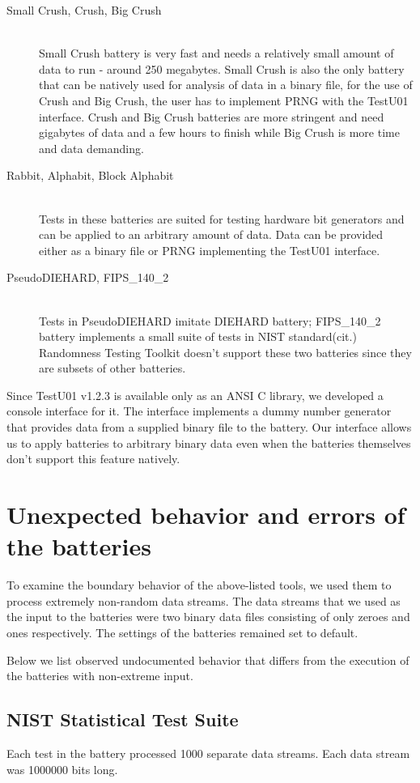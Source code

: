 \documentclass[
  digital,  	%
  color,		%
  oneside,   	%
  12pt,
  nocover,
  notable,
  nolof,
  nolot,
]{fithesis3}
\begin{document}
\begin{description}
\item[Small Crush, Crush, Big Crush] \hfill \\
Small Crush battery is very fast and needs a relatively small amount of data to run - around 250 megabytes. Small Crush is also the only battery that can be natively used for analysis of data in a binary file, for the use of Crush and Big Crush, the user has to implement PRNG with the TestU01 interface. Crush and Big Crush batteries are more stringent and need gigabytes of data and a few hours to finish while Big Crush is more time and data demanding.
\item[Rabbit, Alphabit, Block Alphabit] \hfill \\
Tests in these batteries are suited for testing hardware bit generators and can be applied to an arbitrary amount of data. Data can be provided either as a binary file or PRNG implementing the TestU01 interface.
\item[PseudoDIEHARD, FIPS\_140\_2] \hfill \\
Tests in PseudoDIEHARD imitate DIEHARD battery; FIPS\_140\_2 battery implements a small suite of tests in NIST standard(cit.) Randomness Testing Toolkit doesn't support these two batteries since they are subsets of other batteries.
\end{description}

Since TestU01 v1.2.3 is available only as an ANSI C library, we developed a console interface for it. The interface implements a dummy number generator that provides data from a supplied binary file to the battery. Our interface allows us to apply batteries to arbitrary binary data even when the batteries themselves don't support this feature natively.

\section{Unexpected behavior and errors of the batteries}
To examine the boundary behavior of the above-listed tools, we used them to process extremely non-random data streams. The data streams that we used as the input to the batteries were two binary data files consisting of only zeroes and ones respectively. The settings of the batteries remained set to default. 

Below we list observed undocumented behavior that differs from the execution of the batteries with non-extreme input.

\subsection*{NIST Statistical Test Suite}
Each test in the battery processed 1000 separate data streams. Each data stream was 1000000 bits long.
\end{document}
